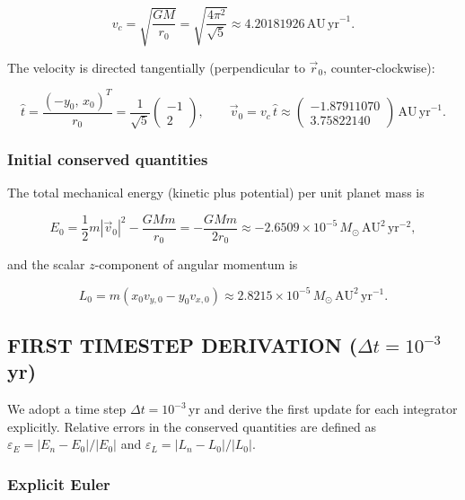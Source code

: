 \begin{equation}
    v_c = \sqrt{\frac{GM}{r_0}} = \sqrt{\frac{4\pi^2}{\sqrt{5}}} \approx 4.20181926\,\mathrm{AU\,yr}^{-1}.
\end{equation}

The velocity is directed tangentially (perpendicular to $\vec{r}_0$, counter-clockwise):

\begin{equation}
    \hat{t} = \frac{(-y_0,\,x_0)^T}{r_0} = \frac{1}{\sqrt{5}}\begin{pmatrix}-1\\2\end{pmatrix},
    \qquad
    \vec{v}_0 = v_c\,\hat{t} \approx \begin{pmatrix}-1.87911070\\3.75822140\end{pmatrix}\,\mathrm{AU\,yr}^{-1}.
\end{equation}

\subsubsection*{Initial conserved quantities}

The total mechanical energy (kinetic plus potential) per unit planet mass is

\begin{equation}
    E_0 = \frac{1}{2}m|\vec{v}_0|^2 - \frac{GMm}{r_0}
    = -\frac{GMm}{2r_0}
    \approx -2.6509\times10^{-5}\,M_\odot\,\mathrm{AU}^2\,\mathrm{yr}^{-2},
\end{equation}

and the scalar $z$-component of angular momentum is

\begin{equation}
    L_0 = m\!\left(x_0 v_{y,0} - y_0 v_{x,0}\right)
    \approx 2.8215\times10^{-5}\,M_\odot\,\mathrm{AU}^2\,\mathrm{yr}^{-1}.
\end{equation}

\subsection{FIRST TIMESTEP DERIVATION ($\Delta t = 10^{-3}$\,yr)}

We adopt a time step $\Delta t = 10^{-3}$\,yr and derive the first update for each integrator explicitly.
Relative errors in the conserved quantities are defined as
$\varepsilon_E = |E_n - E_0|/|E_0|$ and $\varepsilon_L = |L_n - L_0|/|L_0|$.

\subsubsection*{Explicit Euler}

